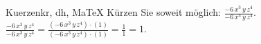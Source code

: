 \begin{MAufgabe}{Kuerzen}{kr, dh, MaTeX}
K\"urzen Sie soweit m\"oglich: $\frac{- 6\, x^3\, y\, z^4}{- 6\, x^3\, y\, z^4}$.\\ 
\ifLsg\MLoesung
\quad $\frac{- 6\, x^3\, y\, z^4}{- 6\, x^3\, y\, z^4}=\frac{(- 6\, x^3\, y\, z^4)\cdot(1)}{(- 6\, x^3\, y\, z^4)\cdot(1)}=\frac{1}{1}=1$.\else\relax\fi
 \end{MAufgabe}